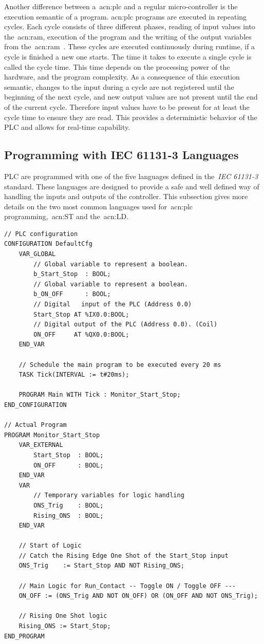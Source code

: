 Another difference between a~\acrshort{acn:plc} and a regular micro-controller is the execution semantic of a program.
\acrshort{acn:plc} programs are executed in repeating cycles.
Each cycle consists of three different phases, reading of input values into the~\acrshort{acn:ram}, execution of the program and the writing of the output variables from the~\acrshort{acn:ram}~\cite[p.~75]{BOLTON200653}.
These cycles are executed continuously during runtime, if a cycle is finished a new one starts.
The time it takes to execute a single cycle is called the cycle time.
This time depends on the processing power of the hardware, and the program complexity.
As a consequence of this execution semantic, changes to the input during a cycle are not registered until the beginning of the next cycle, and new output values are not present until the end of the current cycle.
Therefore input values have to be present for at least the cycle time to ensure they are read.
This provides a deterministic behavior of the PLC and allows for real-time capability.

\subsection{Programming with IEC 61131-3 Languages}

PLC are programmed with one of the five languages defined in the~\textit{IEC 61131-3}~\cite{Plcopen:61131-3} standard.
These languages are designed to provide a safe and well defined way of handling the inputs and outputs of the controller.
This subsection gives more details on the two most common languages used for~\acrshort{acn:plc} programming,~\acrfull{acn:ST} and the~\acrfull{acn:LD}.

\lstset{language=Pascal}
\begin{lstlisting}[caption={Example of~\gls{acn:ST} code. Source:~\cite{Wiki:ST}},label=lst:ex:st]
// PLC configuration
CONFIGURATION DefaultCfg
	VAR_GLOBAL
		// Global variable to represent a boolean.
		b_Start_Stop  : BOOL;
		// Global variable to represent a boolean.
		b_ON_OFF      : BOOL;
		// Digital   input of the PLC (Address 0.0)
		Start_Stop AT %IX0.0:BOOL;
		// Digital output of the PLC (Address 0.0). (Coil)
		ON_OFF     AT %QX0.0:BOOL;
	END_VAR

	// Schedule the main program to be executed every 20 ms
	TASK Tick(INTERVAL := t#20ms);

	PROGRAM Main WITH Tick : Monitor_Start_Stop;
END_CONFIGURATION

// Actual Program
PROGRAM Monitor_Start_Stop          
	VAR_EXTERNAL
		Start_Stop  : BOOL;
		ON_OFF      : BOOL;
	END_VAR
	VAR
		// Temporary variables for logic handling     
		ONS_Trig    : BOOL;
		Rising_ONS  : BOOL;
	END_VAR

	// Start of Logic
	// Catch the Rising Edge One Shot of the Start_Stop input
	ONS_Trig    := Start_Stop AND NOT Rising_ONS;

	// Main Logic for Run_Contact -- Toggle ON / Toggle OFF ---
	ON_OFF := (ONS_Trig AND NOT ON_OFF) OR (ON_OFF AND NOT ONS_Trig);

	// Rising One Shot logic   
	Rising_ONS := Start_Stop;
END_PROGRAM
\end{lstlisting}

